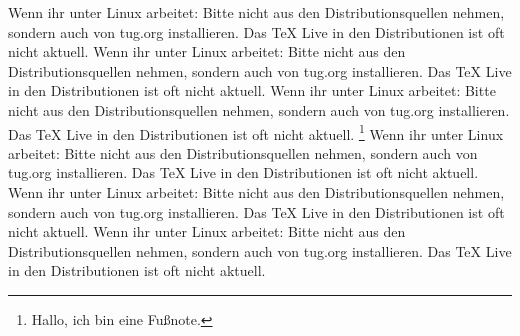 \documentclass[ngerman,12pt,parskip=half]{scrreprt}
\begin{document}
Wenn ihr unter Linux arbeitet: Bitte nicht aus den Distributionsquellen nehmen, sondern auch von tug.org installieren. Das TeX Live in den Distributionen ist oft nicht aktuell. Wenn ihr unter Linux arbeitet: Bitte nicht aus den Distributionsquellen nehmen, sondern auch von tug.org installieren. Das TeX Live in den Distributionen ist oft nicht aktuell. Wenn ihr unter Linux arbeitet: Bitte nicht aus den Distributionsquellen nehmen, sondern auch von tug.org installieren. Das TeX Live in den Distributionen ist oft nicht aktuell. \footnote{Hallo, ich bin eine Fußnote.}
Wenn ihr unter Linux arbeitet: Bitte nicht aus den Distributionsquellen nehmen, sondern auch von tug.org installieren. Das TeX Live in den Distributionen ist oft nicht aktuell. Wenn ihr unter Linux arbeitet: Bitte nicht aus den Distributionsquellen nehmen, sondern auch von tug.org installieren. 
Das TeX Live in den Distributionen ist oft nicht aktuell. Wenn ihr unter Linux arbeitet: Bitte nicht aus den Distributionsquellen nehmen, sondern auch von tug.org installieren. Das TeX Live in den Distributionen ist oft nicht aktuell.
\end{document}

